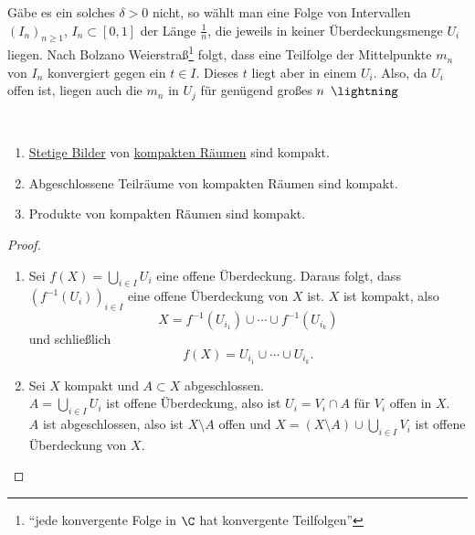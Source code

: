 \begin{remark}
  Gäbe es ein solches \( \delta > 0 \) nicht, so wählt man eine Folge von Intervallen \( {(I_n)}_{n \geq 1} \), \( I_n \subset [0,1] \) der Länge \( \tfrac{1}{n} \), die jeweils in keiner Überdeckungsmenge \( U_i \) liegen. Nach Bolzano Weierstraß\footnote{``jede konvergente Folge in \( \C \) hat konvergente Teilfolgen''} folgt, dass eine Teilfolge der Mittelpunkte \( m_n \) von \( I_n \) konvergiert gegen ein \( t \in I \). Dieses \( t \) liegt aber in einem \( U_i \). Also, da \( U_i \) offen ist, liegen auch die \( m_n \) in \( U_j \) für genügend großes \( n \enskip \lightning \)
\end{remark}

\begin{theorem}
  \
  \begin{enumerate}
    \item \hyperref[def:stetig]{Stetige Bilder} von \hyperref[def:kompakt]{kompakten Räumen} sind kompakt.
    \item Abgeschlossene Teilräume von kompakten Räumen sind kompakt.
    \item Produkte von kompakten Räumen sind kompakt. 
  \end{enumerate}
  \begin{proof}
    \
    \begin{enumerate}
      \item Sei \( f(X) = \bigcup_{i \in I} U_i \) eine offene Überdeckung. Daraus folgt, dass \( {\left( f^{-1}(U_i) \right)}_{i \in I} \) eine offene Überdeckung von \( X \) ist. \( X \) ist kompakt, also
      \begin{equation*}
        X = f^{-1}(U_{i_1}) \cup \cdots \cup f^{-1}(U_{i_k})
      \end{equation*}
      und schließlich
      \begin{equation*}
        f(X) = U_{i_1} \cup \cdots \cup U_{i_k}\text{.}
      \end{equation*}
      \item Sei \( X \) kompakt und \( A \subset X \) abgeschlossen. \\
        \( A = \bigcup_{i \in I} U_i \) ist offene Überdeckung, also ist \( U_i = V_i \cap A \) für \( V_i \) offen in \( X \). \\
        \( A \) ist abgeschlossen, also ist \( X \setminus A \) offen und \( X = (X \setminus A) \cup \bigcup_{i \in I} V_i \) ist offene Überdeckung von \( X \). \\

\end{enumerate}
\end{proof}
\end{theorem}
